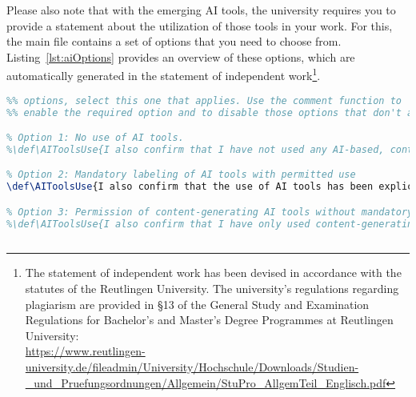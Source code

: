 Please also note that with the emerging AI tools, the university requires you to provide a statement about the utilization of those tools in your work. For this, the main file contains a set of options that you need to choose from. Listing~\ref{lst:aiOptions} provides an overview of these options, which are automatically generated in the statement of independent work\footnote{The statement of independent work has been devised in accordance with the statutes of the Reutlingen University. The university’s regulations regarding plagiarism are provided in §13 of the General Study and Examination Regulations for Bachelor’s and Master’s Degree Programmes at Reutlingen University:\\ \url{https://www.reutlingen-university.de/fileadmin/University/Hochschule/Downloads/Studien-\_und\_Pruefungsordnungen/Allgemein/StuPro\_AllgemTeil\_Englisch.pdf}}.
\begin{lstlisting}[captionpos=b, language=TeX, commentstyle=\color{blue}\itshape, caption=Options to characterize the use of AI tools in the thesis,label=lst:aiOptions]
%% Selection of the AI utilization in this thesis: From the following three 
%% options, select this one that applies. Use the comment function to 
%% enable the required option and to disable those options that don't apply

% Option 1: No use of AI tools. 
%\def\AIToolsUse{I also confirm that I have not used any AI-based, content-generating tools.}

% Option 2: Mandatory labeling of AI tools with permitted use 
\def\AIToolsUse{I also confirm that the use of AI tools has been explicitly permitted by the examiner and that I have made use of them in my work. The AI tools used are attached to the thesis in accordance with the faculty's internal citation and documentation requirements. I only used content-generating AI tools for support and did not let the AI take over the core theses of my work. I am aware that the use of AI tools does not guarantee accuracy and that I am responsible for all AI-generated content in this thesis.}

% Option 3: Permission of content-generating AI tools without mandatory labeling 
%\def\AIToolsUse{I also confirm that I have only used content-generating AI tools in a supportive manner and have not allowed the AI to take over the core theses of my work. I am aware that the use of AI tools does not guarantee accuracy and that I am responsible for all AI-generated content in this thesis.}
 
\end{lstlisting}

